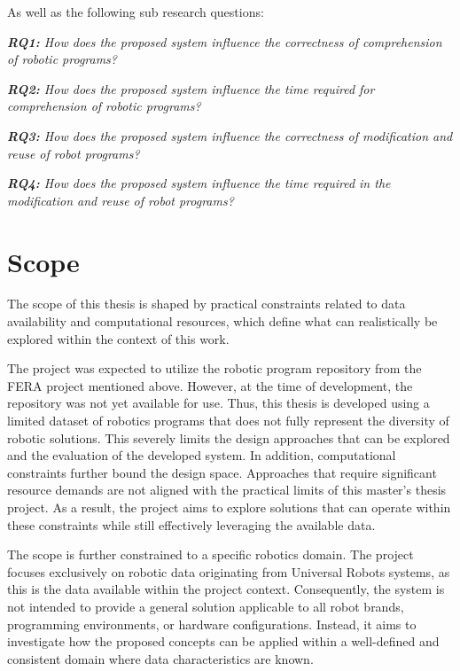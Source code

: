 As well as the following sub research questions:
\begin{adjustwidth}{\indentWidthTwenty}{\indentWidthTwenty}
    \textit{\textbf{RQ1:} How does the proposed system influence the correctness of comprehension of robotic programs?}
\end{adjustwidth}
\begin{adjustwidth}{\indentWidthTwenty}{\indentWidthTwenty}
    \textit{\textbf{RQ2:} How does the proposed system influence the time required for comprehension of robotic programs?}
\end{adjustwidth}
\begin{adjustwidth}{\indentWidthTwenty}{\indentWidthTwenty}
    \textit{\textbf{RQ3:} How does the proposed system influence the correctness of modification and reuse of robot programs?}
\end{adjustwidth}
\begin{adjustwidth}{\indentWidthTwenty}{\indentWidthTwenty}
    \textit{\textbf{RQ4:} How does the proposed system influence the time required in the modification and reuse of robot programs?}
\end{adjustwidth}

\section{Scope} \label{sec:introduction:scope}
The scope of this thesis is shaped by practical constraints related to data availability and computational resources, which define what can realistically be explored within the context of this work.

The project was expected to utilize the robotic program repository from the FERA project mentioned above. However, at the time of development, the repository was not yet available for use. Thus, this thesis is developed using a limited dataset of robotics programs that does not fully represent the diversity of robotic solutions. This severely limits the design approaches that can be explored and the evaluation of the developed system. In addition, computational constraints further bound the design space. Approaches that require significant resource demands are not aligned with the practical limits of this master's thesis project. As a result, the project aims to explore solutions that can operate within these constraints while still effectively leveraging the available data.

The scope is further constrained to a specific robotics domain. The project focuses exclusively on robotic data originating from Universal Robots systems, as this is the data available within the project context. Consequently, the system is not intended to provide a general solution applicable to all robot brands, programming environments, or hardware configurations. Instead, it aims to investigate how the proposed concepts can be applied within a well-defined and consistent domain where data characteristics are known.